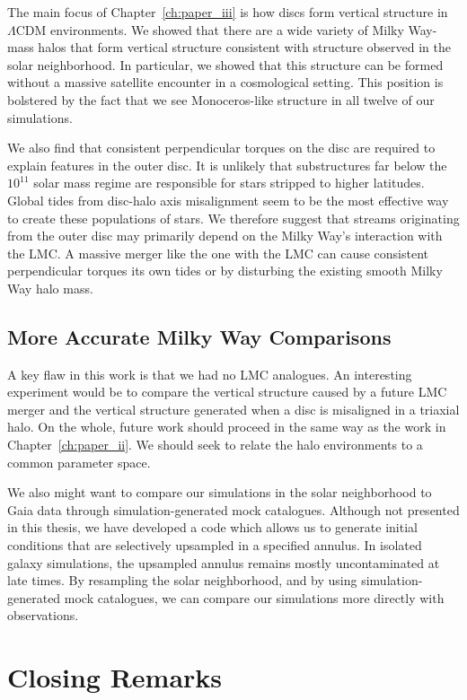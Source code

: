 The main focus of Chapter~\ref{ch:paper_iii} is how discs form vertical structure in $\Lambda$CDM environments. We showed that there are a wide variety of Milky Way-mass halos that form vertical structure consistent with structure observed in the solar neighborhood. In particular, we showed that this structure can be formed without a massive satellite encounter in a cosmological setting. This position is bolstered by the fact that we see Monoceros-like structure in all twelve of our simulations.

We also find that consistent perpendicular torques on the disc are required to explain features in the outer disc. It is unlikely that substructures far below the $10^{11}$ solar mass regime are responsible for stars stripped to higher latitudes. Global tides from disc-halo axis misalignment seem to be the most effective way to create these populations of stars. We therefore suggest that streams originating from the outer disc may primarily depend on the Milky Way's interaction with the LMC. A massive merger like the one with the LMC can cause consistent perpendicular torques its own tides or by disturbing the existing smooth Milky Way halo mass. 

\subsection{More Accurate Milky Way Comparisons}

A key flaw in this work is that we had no LMC analogues. An interesting experiment would be to compare the vertical structure caused by a future LMC merger and the vertical structure generated when a disc is misaligned in a triaxial halo. On the whole, future work should proceed in the same way as the work in Chapter~\ref{ch:paper_ii}. We should seek to relate the halo environments to a common parameter space.

We also might want to compare our simulations in the solar neighborhood to Gaia data through simulation-generated mock catalogues. Although not presented in this thesis, we have developed a code which allows us to generate initial conditions that are selectively upsampled in a specified annulus. In isolated galaxy simulations, the upsampled annulus remains mostly uncontaminated at late times. By resampling the solar neighborhood, and by using simulation-generated mock catalogues, we can compare our simulations more directly with observations.

\section{Closing Remarks}

